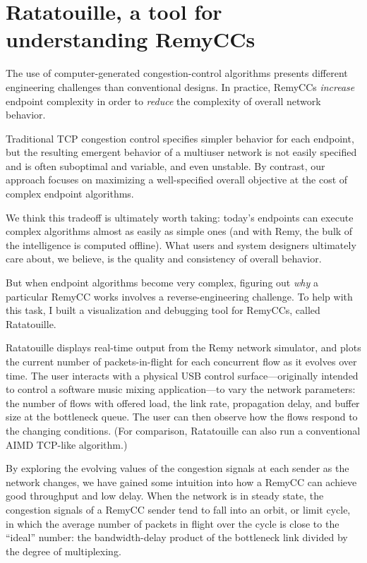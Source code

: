 \section{Ratatouille, a tool for understanding RemyCCs}

The use of computer-generated congestion-control algorithms presents
different engineering challenges than conventional designs. In
practice, RemyCCs \emph{increase} endpoint complexity in order to
\emph{reduce} the complexity of overall network behavior.

Traditional TCP congestion control specifies simpler behavior for each
endpoint, but the resulting emergent behavior of a multiuser network
is not easily specified and is often suboptimal and variable, and even
unstable. By contrast, our approach focuses on maximizing a
well-specified overall objective at the cost of complex endpoint
algorithms.

We think this tradeoff is ultimately worth taking: today's endpoints
can execute complex algorithms almost as easily as simple ones (and
with Remy, the bulk of the intelligence is computed offline). What
users and system designers ultimately care about, we believe, is the
quality and consistency of overall behavior.

But when endpoint algorithms become very complex, figuring out
\emph{why} a particular RemyCC works involves a reverse-engineering
challenge. To help with this task, I built a visualization and
debugging tool for RemyCCs, called Ratatouille.

Ratatouille displays real-time output from the Remy network simulator,
and plots the current number of packets-in-flight for each concurrent
flow as it evolves over time. The user interacts with a physical USB
control surface---originally intended to control a software music
mixing application---to vary the network parameters: the number of
flows with offered load, the link rate, propagation delay, and buffer
size at the bottleneck queue. The user can then observe how the flows
respond to the changing conditions. (For comparison, Ratatouille can
also run a conventional AIMD TCP-like algorithm.)

By exploring the evolving values of the congestion signals at each
sender as the network changes, we have gained some intuition into how
a RemyCC can achieve good throughput and low delay. When the network
is in steady state, the congestion signals of a RemyCC sender tend to
fall into an orbit, or limit cycle, in which the average number of
packets in flight over the cycle is close to the ``ideal'' number: the
bandwidth-delay product of the bottleneck link divided by the degree
of multiplexing.

